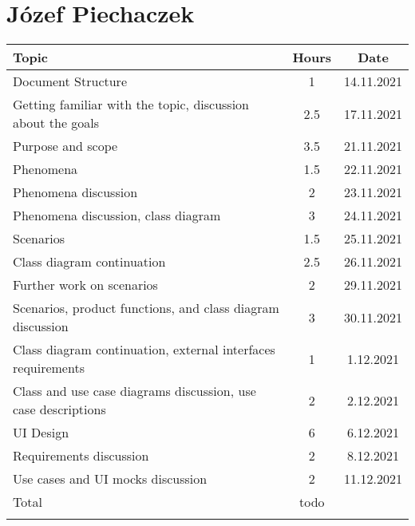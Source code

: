 \section*{Józef Piechaczek}
\begin{table}[H]
    \centering
    \begin{tabular}{lcc} \Xhline{1.5pt}
        Topic &  Hours & Date \\ \hline
        Document Structure & 1 & 14.11.2021 \\ 
        Getting familiar with the topic, discussion about the goals & 2.5 & 17.11.2021 \\ 
        Purpose and scope & 3.5 & 21.11.2021 \\ 
        Phenomena & 1.5 & 22.11.2021 \\ 
        Phenomena discussion & 2 & 23.11.2021 \\
        Phenomena discussion, class diagram & 3 & 24.11.2021 \\ 
        Scenarios & 1.5 & 25.11.2021 \\
        Class diagram continuation & 2.5 & 26.11.2021 \\ 
        Further work on scenarios & 2 & 29.11.2021 \\
        Scenarios, product functions, and class diagram discussion & 3 & 30.11.2021\\ 
        Class diagram continuation, external interfaces requirements & 1 & 1.12.2021\\
        Class and use case diagrams discussion, use case descriptions & 2 & 2.12.2021\\
        UI Design & 6 & 6.12.2021\\ 
        Requirements discussion & 2 & 8.12.2021\\
        Use cases and UI mocks discussion & 2 & 11.12.2021\\
        \hline
        Total &  todo & \\ \Xhline{1.5pt}
    \end{tabular}
\end{table}


